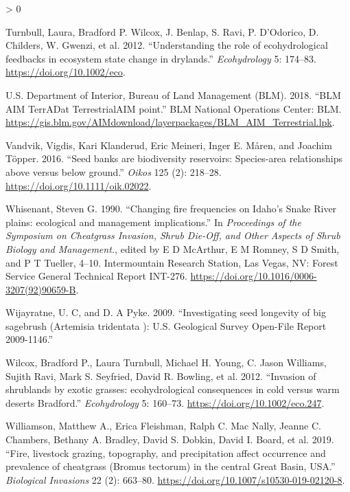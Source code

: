 \documentclass[
  12pt,
]{article}
\newlength{\cslhangindent}
\newenvironment{CSLReferences}[2] %
 {%
  \setlength{\parindent}{0pt}
  \ifodd #1 \everypar{\setlength{\hangindent}{\cslhangindent}}\ignorespaces\fi
  \ifnum #2 > 0
  \setlength{\parskip}{#2\baselineskip}
  \fi
 }%
 {}
\begin{document}
\begin{CSLReferences}{1}{0}
\leavevmode\hypertarget{ref-Turnbull2012}{}%
Turnbull, Laura, Bradford P. Wilcox, J. Benlap, S. Ravi, P. D'Odorico,
D. Childers, W. Gwenzi, et al. 2012. {``{Understanding the role of
ecohydrological feedbacks in ecosystem state change in drylands}.''}
\emph{Ecohydrology} 5: 174--83. \url{https://doi.org/10.1002/eco}.

\leavevmode\hypertarget{ref-AIM}{}%
U.S. Department of Interior, Bureau of Land Management (BLM). 2018.
{``{BLM AIM TerrADat TerrestrialAIM point}.''} BLM National Operations
Center: BLM.
\url{https://gis.blm.gov/AIMdownload/layerpackages/BLM_AIM_Terrestrial.lpk}.

\leavevmode\hypertarget{ref-Vandvik2016}{}%
Vandvik, Vigdis, Kari Klanderud, Eric Meineri, Inger E. Måren, and
Joachim Töpper. 2016. {``{Seed banks are biodiversity reservoirs:
Species-area relationships above versus below ground}.''} \emph{Oikos}
125 (2): 218--28. \url{https://doi.org/10.1111/oik.02022}.

\leavevmode\hypertarget{ref-Whisenant1990}{}%
Whisenant, Steven G. 1990. {``{Changing fire frequencies on Idaho's
Snake River plains: ecological and management implications}.''} In
\emph{Proceedings of the Symposium on Cheatgrass Invasion, Shrub
Die-Off, and Other Aspects of Shrub Biology and Management.}, edited by
E D McArthur, E M Romney, S D Smith, and P T Tueller, 4--10.
Intermountain Research Station, Las Vegas, NV: Forest Service General
Technical Report INT-276.
\url{https://doi.org/10.1016/0006-3207(92)90659-B}.

\leavevmode\hypertarget{ref-Wijayratne2009}{}%
Wijayratne, U. C, and D. A Pyke. 2009. {``{Investigating seed longevity
of big sagebrush (Artemisia tridentata ): U.S. Geological Survey
Open-File Report 2009-1146}.''}

\leavevmode\hypertarget{ref-Wilcox2012}{}%
Wilcox, Bradford P., Laura Turnbull, Michael H. Young, C. Jason
Williams, Sujith Ravi, Mark S. Seyfried, David R. Bowling, et al. 2012.
{``{Invasion of shrublands by exotic grasses: ecohydrological
consequences in cold versus warm deserts Bradford}.''}
\emph{Ecohydrology} 5: 160--73. \url{https://doi.org/10.1002/eco.247}.

\leavevmode\hypertarget{ref-Williamson2019}{}%
Williamson, Matthew A., Erica Fleishman, Ralph C. Mac Nally, Jeanne C.
Chambers, Bethany A. Bradley, David S. Dobkin, David I. Board, et al.
2019. {``{Fire, livestock grazing, topography, and precipitation affect
occurrence and prevalence of cheatgrass (Bromus tectorum) in the central
Great Basin, USA}.''} \emph{Biological Invasions} 22 (2): 663--80.
\url{https://doi.org/10.1007/s10530-019-02120-8}.


\end{CSLReferences}
\end{document}
